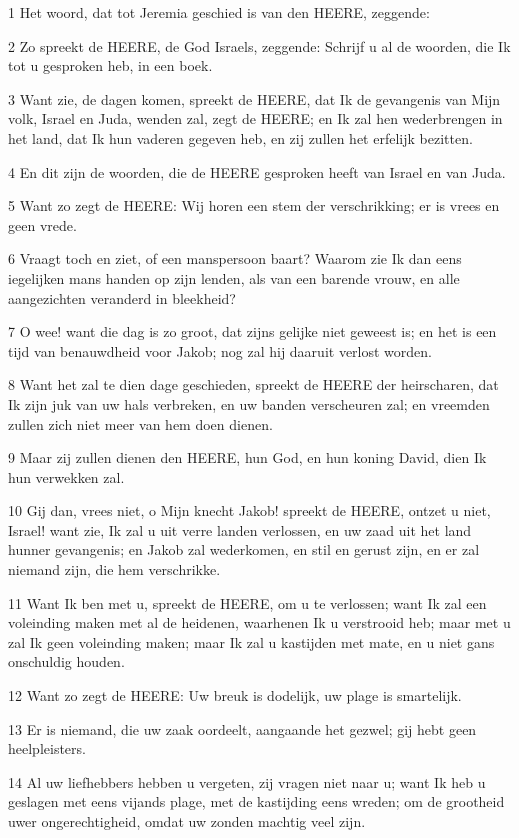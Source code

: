 \par 1 Het woord, dat tot Jeremia geschied is van den HEERE, zeggende:
\par 2 Zo spreekt de HEERE, de God Israels, zeggende: Schrijf u al de woorden, die Ik tot u gesproken heb, in een boek.
\par 3 Want zie, de dagen komen, spreekt de HEERE, dat Ik de gevangenis van Mijn volk, Israel en Juda, wenden zal, zegt de HEERE; en Ik zal hen wederbrengen in het land, dat Ik hun vaderen gegeven heb, en zij zullen het erfelijk bezitten.
\par 4 En dit zijn de woorden, die de HEERE gesproken heeft van Israel en van Juda.
\par 5 Want zo zegt de HEERE: Wij horen een stem der verschrikking; er is vrees en geen vrede.
\par 6 Vraagt toch en ziet, of een manspersoon baart? Waarom zie Ik dan eens iegelijken mans handen op zijn lenden, als van een barende vrouw, en alle aangezichten veranderd in bleekheid?
\par 7 O wee! want die dag is zo groot, dat zijns gelijke niet geweest is; en het is een tijd van benauwdheid voor Jakob; nog zal hij daaruit verlost worden.
\par 8 Want het zal te dien dage geschieden, spreekt de HEERE der heirscharen, dat Ik zijn juk van uw hals verbreken, en uw banden verscheuren zal; en vreemden zullen zich niet meer van hem doen dienen.
\par 9 Maar zij zullen dienen den HEERE, hun God, en hun koning David, dien Ik hun verwekken zal.
\par 10 Gij dan, vrees niet, o Mijn knecht Jakob! spreekt de HEERE, ontzet u niet, Israel! want zie, Ik zal u uit verre landen verlossen, en uw zaad uit het land hunner gevangenis; en Jakob zal wederkomen, en stil en gerust zijn, en er zal niemand zijn, die hem verschrikke.
\par 11 Want Ik ben met u, spreekt de HEERE, om u te verlossen; want Ik zal een voleinding maken met al de heidenen, waarhenen Ik u verstrooid heb; maar met u zal Ik geen voleinding maken; maar Ik zal u kastijden met mate, en u niet gans onschuldig houden.
\par 12 Want zo zegt de HEERE: Uw breuk is dodelijk, uw plage is smartelijk.
\par 13 Er is niemand, die uw zaak oordeelt, aangaande het gezwel; gij hebt geen heelpleisters.
\par 14 Al uw liefhebbers hebben u vergeten, zij vragen niet naar u; want Ik heb u geslagen met eens vijands plage, met de kastijding eens wreden; om de grootheid uwer ongerechtigheid, omdat uw zonden machtig veel zijn.
